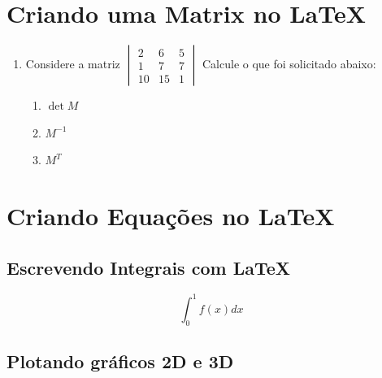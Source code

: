\documentclass[a4paper,12pt]{article}
\begin{document}
\newpage


\section{Criando uma Matrix no \LaTeX}
\begin{enumerate}
\item Considere a matriz
$
\begin{vmatrix}
    2 & 6 & 5 \\
    1 & 7 & 7 \\
    10 & 15 & 1

\end{vmatrix}
$ Calcule o que foi solicitado abaixo:
\begin{enumerate}
    \item $\det M$
    \item $M^{-1}$
    \item $M^T$
\end{enumerate}

\end{enumerate}

\section{Criando Equações no \LaTeX}
\subsection{Escrevendo Integrais com \LaTeX}

\begin{equation}
    \int_0^1 f(x)dx
\end{equation}

\subsection{Plotando gráficos 2D e 3D}


\end{document}
